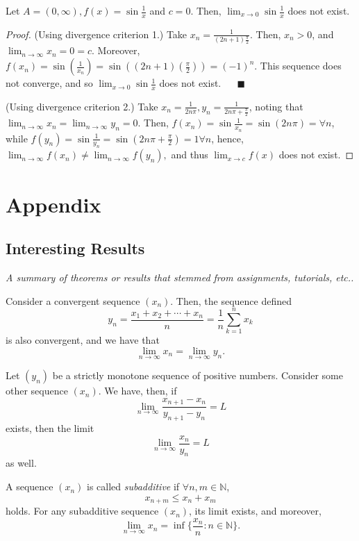 \documentclass[12pt]{article}
\renewcommand{\qedsymbol}{$\blacksquare$}
\begin{document}
\begin{example}
  Let $A = (0, \infty), f(x) = \sin \frac{1}{x}$ and $c = 0$. Then, $\lim_{x \to 0} \sin \frac{1}{x}$ does not exist.
  \begin{proof}
    (Using divergence criterion 1.) Take $x_n = \frac{1}{(2n+1) \frac{\pi}{2}}$. Then, $x_n > 0$, and $\lim_{n \to \infty} x_n = 0 = c$. Moreover, $f(x_n) = \sin (\frac{1}{x_n}) = \sin ((2n+1)(\frac{\pi}{2})) = (-1)^{n}$. This sequence does not converge, and so $\lim_{x \to 0} \sin \frac{1}{x}$ does not exist. $\quad$ \qedsymbol

    \noindent(Using divergence criterion 2.) Take $x_n = \frac{1}{2n\pi}, y_n = \frac{1}{2n\pi + \frac{\pi}{2}}$, noting that $\lim_{n\to\infty} x_n = \lim_{n \to \infty} y_n = 0$. Then, $f(x_n) = \sin \frac{1}{x_n} = \sin (2n \pi) = \forall n$, while $f(y_n) = \sin \frac{1}{y_n} = \sin (2n \pi + \frac{\pi}{2}) = 1 \forall n$, hence, $\lim_{n\to\infty} f(x_n) \neq \lim_{n\to\infty} f(y_n),$ and thus $\lim_{x\to c} f(x)$ does not exist.
  \end{proof}
\end{example}



\newpage
\section{Appendix}
\subsection{Interesting Results}
\textit{A summary of theorems or results that stemmed from assignments, tutorials, etc..}

\begin{theorem}
  Consider a convergent sequence $(x_n)$. Then, the sequence defined \[y_n = \frac{x_1 + x_2 + \cdots +x_n}{n} = \frac{1}{n} \sum_{k=1}^{n} x_k\] is also convergent, and we have that \[\lim_{n\to\infty} x_n = \lim_{n\to\infty} y_n.\]
\end{theorem}
\begin{theorem}
  Let $(y_n)$ be a strictly monotone sequence of positive numbers. Consider some other sequence $(x_n)$. We have, then, if \[\lim_{n\to\infty} \frac{x_{n+1}-x_n}{y_{n+1}-y_n} = L\] exists, then the limit \[\lim_{n\to\infty} \frac{x_n}{y_n} = L\] as well.
\end{theorem}

\begin{lemma}
   A sequence $(x_n)$ is called \emph{subadditive} if $\forall n, m \in \mathbb{N}$, \[
   x_{n+m} \leq x_n + x_m 
   \]
   holds. For any subadditive sequence $(x_n)$, its limit exists, and moreover, \[
    \lim_{n\to\infty} x_n = \inf \{\frac{x_n}{n} : n \in \mathbb{N}\}.
   \]
\end{lemma}
\end{document}
